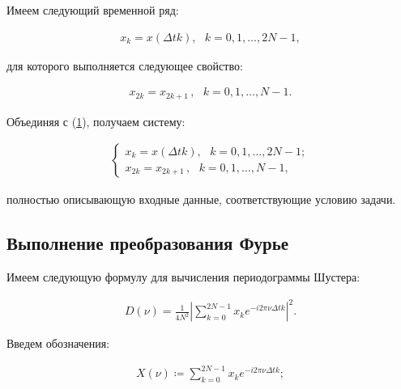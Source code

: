 \documentclass[12pt]{article}
\newcommand{\hl}[1]{(\hyperlink{eq:#1}{#1})}
\newcommand{\sd}[1]{\hypertarget{skip:#1}{\vspace{-10pt}}}
\newcommand{\hep}[2]{\vspace{#2pt}\hypertarget{eq:#1}{}\vspace{-#2pt}}
\newcommand{\hs}[1]{\sd{#1}\hep{#1}{18}}
\newcommand{\hst}[1]{\sd{#1}\hep{#1}{22}}
\begin{document}
Имеем следующий временной ряд:

\hst{1}
\begin{gather}
    x_k = x\left(\Delta t k\right) , \hspace{8pt} k = 0, 1, \ldots, 2N - 1,
\end{gather}

для которого выполняется следующее свойство:

\hst{2}
\begin{gather}
    x_{2k} = x_{2k+1} \hspace{2pt} , \hspace{8pt} k = 0, 1, \ldots, N - 1.
\end{gather}

Объединяя с \hl{1}, получаем систему:

\hs{3}
\begin{gather}
    \begin{cases}
        x_k = x\left(\Delta t k\right) , \hspace{8pt} k = 0, 1, \ldots, 2N - 1; \\
        x_{2k} = x_{2k+1} \hspace{2pt} , \hspace{8pt} k = 0, 1, \ldots, N - 1,
    \end{cases}
\end{gather}

\vspace{5pt}

полностью описывающую входные данные, соответствующие условию задачи.

\subsection{Выполнение преобразования Фурье}

Имеем следующую формулу для вычисления периодограммы Шустера:

\hs{4}
\begin{gather}
    D(\nu) = \frac{1}{4 N^2} \left| \sum_{k = 0}^{2 N - 1} x_k e^{-i 2 \pi \nu \Delta t k} \right|^2.
\end{gather}

Введем обозначения:

\sd{5}
\begin{gather}
    X( \nu ) \coloneqq \sum_{k = 0}^{2 N - 1} x_k e^{-i 2 \pi \nu \Delta t k };
\end{gather}

\begin{minipage}[t][5pt]{10pt}

\end{minipage}
\end{document}
